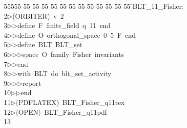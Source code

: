 %
%
\begin{tabbing}
55555 \= 55 \= 55 \= 55 \= 55 \= 55 \= 55 \= 55 \= 55 \= 55 \= 55 \= 55 \= 55 \= \>BLT\_11\_Fisher:\\[0pt]
2\>$\triangleright$\>(ORBITER)\ v\ 2\ \\[0pt]
3\>$\triangleright$\>$\triangleright$\>define\ F\ finite\_field\ q\ 11\ end\ \\[0pt]
4\>$\triangleright$\>$\triangleright$\>define\ O\ orthogonal\_space\ 0\ 5\ F\ end\ \\[0pt]
5\>$\triangleright$\>$\triangleright$\>define\ BLT\ BLT\_set\ \\[0pt]
6\>$\triangleright$\>$\triangleright$\>$\triangleright$\>space\ O\ family\ Fisher\ invariants\ \\[0pt]
7\>$\triangleright$\>$\triangleright$\>end\ \\[0pt]
8\>$\triangleright$\>$\triangleright$\>with\ BLT\ do\ blt\_set\_activity\ \\[0pt]
9\>$\triangleright$\>$\triangleright$\>$\triangleright$\>report\ \\[0pt]
10\>$\triangleright$\>$\triangleright$\>end\\[0pt]
11\>$\triangleright$\>(PDFLATEX)\ BLT\_Fisher\_q11tex\\[0pt]
12\>$\triangleright$\>(OPEN)\ BLT\_Fisher\_q11pdf\\[0pt]
13\>\end{tabbing}
